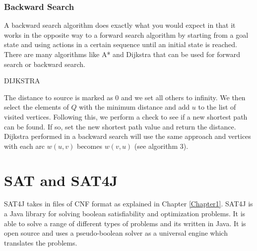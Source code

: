 \subsubsection{Backward Search}
A backward search algorithm does exactly what you would expect in that it works in the opposite way to a forward search algorithm by starting from a goal state and using actions in a certain sequence until an initial state is reached. 
There are many algorithms like A* and Dijkstra that can be used for forward search or backward search.
\\ 
\begin{algorithm}[H]
\caption{DIJKSTRA}
\end{algorithm}
The distance to source is marked as 0 and we set all others to infinity. We then select the elements of $Q$ with the minimum distance and add $u$ to the list of visited vertices. Following this, we perform a check to see if a new shortest path can be found. If so, set the new shortest path value and return the distance. 
Dijkstra performed in a backward search will use the same approach and vertices with each arc $w(u, v)$ becomes $w(v, u)$ (see algorithm 3).
\section{SAT and SAT4J} 
SAT4J takes in files of CNF format as explained in Chapter \ref{Chapter1}. SAT4J is a Java library for solving boolean satisfiability and optimization problems\cite{SATandSAT4J}. It is able to solve a range of different types of problems and its written in Java. It is open source and uses a pseudo-boolean solver as a universal engine which translates the problems\cite{SATandSAT4J}. 


